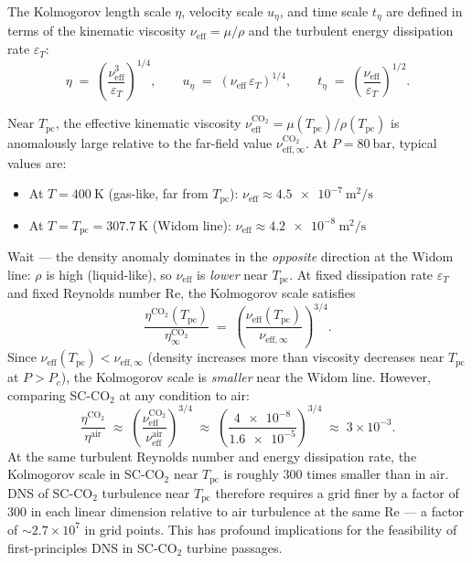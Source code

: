 \documentclass[12pt,a4paper]{article}
\newcommand{\eps}{\varepsilon}
\newcommand{\Tc}{T_{\mathrm{pc}}}   %
\newcommand{\sco}{SC-CO$_2$}
\newcommand{\Rey}{\mathrm{Re}}
\newcommand{\Kol}{\eta}             %
\begin{document}
The Kolmogorov length scale $\Kol$, velocity scale $u_\Kol$, and time scale $t_\Kol$
are defined in terms of the kinematic viscosity $\nu_{\mathrm{eff}} = \mu/\rho$ and
the turbulent energy dissipation rate $\eps_T$:
\begin{equation}
  \Kol \;=\; \left(\frac{\nu_{\mathrm{eff}}^3}{\eps_T}\right)^{1/4}, \qquad
  u_\Kol \;=\; (\nu_{\mathrm{eff}}\,\eps_T)^{1/4}, \qquad
  t_\Kol \;=\; \left(\frac{\nu_{\mathrm{eff}}}{\eps_T}\right)^{1/2}.
  \label{eq:kolmogorov_scales}
\end{equation}

Near $\Tc$, the effective kinematic viscosity
$\nu_{\mathrm{eff}}^{\mathrm{CO_2}} = \mu(\Tc)/\rho(\Tc)$ is anomalously large
relative to the far-field value $\nu_{\mathrm{eff},\infty}^{\mathrm{CO_2}}$.
At $P = \SI{80}{\bar}$, typical values are:
\begin{itemize}
  \item At $T = \SI{400}{\kelvin}$ (gas-like, far from $\Tc$):
    $\nu_{\mathrm{eff}} \approx \SI{4.5e-7}{\metre\squared\per\second}$
  \item At $T = \Tc = \SI{307.7}{\kelvin}$ (Widom line):
    $\nu_{\mathrm{eff}} \approx \SI{4.2e-8}{\metre\squared\per\second}$
\end{itemize}
Wait --- the density anomaly dominates in the \emph{opposite} direction at the
Widom line: $\rho$ is high (liquid-like), so $\nu_{\mathrm{eff}}$ is
\emph{lower} near $\Tc$.  At fixed dissipation rate $\eps_T$ and
fixed Reynolds number $\Rey$, the Kolmogorov scale satisfies
\begin{equation}
  \frac{\Kol^{\mathrm{CO_2}}(\Tc)}{\Kol^{\mathrm{CO_2}}_\infty}
  \;=\; \left(\frac{\nu_{\mathrm{eff}}(\Tc)}{\nu_{\mathrm{eff},\infty}}\right)^{3/4}.
\end{equation}
Since $\nu_{\mathrm{eff}}(\Tc) < \nu_{\mathrm{eff},\infty}$ (density increases more
than viscosity decreases near $\Tc$ at $P > P_c$), the Kolmogorov scale is
\emph{smaller} near the Widom line.  However, comparing \sco{} at any condition
to air:
\begin{equation}
  \frac{\Kol^{\mathrm{CO_2}}}{\Kol^{\mathrm{air}}}
  \;\approx\; \left(\frac{\nu_{\mathrm{eff}}^{\mathrm{CO_2}}}{\nu_{\mathrm{eff}}^{\mathrm{air}}}\right)^{3/4}
  \;\approx\; \left(\frac{\SI{4e-8}}{\SI{1.6e-5}}\right)^{3/4}
  \;\approx\; 3 \times 10^{-3}.
\end{equation}
At the same turbulent Reynolds number and energy dissipation rate, the Kolmogorov
scale in \sco{} near $\Tc$ is roughly 300 times smaller than in air.  DNS of
\sco{} turbulence near $\Tc$ therefore requires a grid finer by a factor of 300
in each linear dimension relative to air turbulence at the same $\Rey$ --- a
factor of $\sim 2.7 \times 10^7$ in grid points.  This has profound implications
for the feasibility of first-principles DNS in \sco{} turbine passages.
\end{document}
